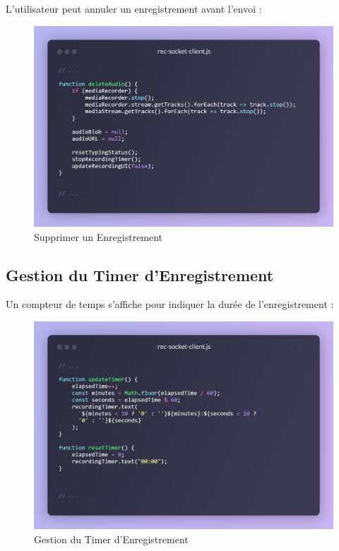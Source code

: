 L'utilisateur peut annuler un enregistrement avant l'envoi :

\begin{figure}[H]
    \centering
    \includegraphics[width=15cm]{assets/annexes/snippet (31).png}
    \caption{ Supprimer un Enregistrement}
\end{figure}

\subsection*{Gestion du Timer d’Enregistrement}

Un compteur de temps s'affiche pour indiquer la durée de l'enregistrement :

\begin{figure}[H]
    \centering
    \includegraphics[width=15cm]{assets/annexes/snippet (32).png}
    \caption{ Gestion du Timer d’Enregistrement}
\end{figure}


